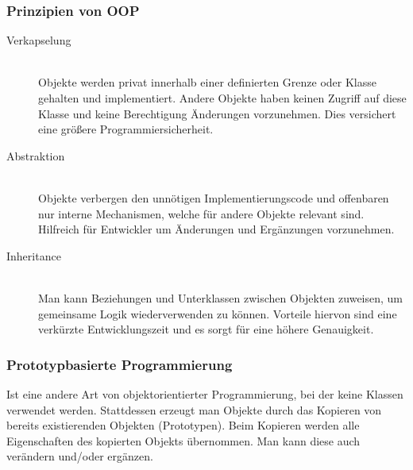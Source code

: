 \subsubsection{Prinzipien von OOP}
\begin{description}
\item[Verkapselung]\hfill \\
 Objekte werden privat innerhalb einer definierten Grenze oder Klasse gehalten und implementiert. 
 Andere Objekte haben keinen Zugriff auf diese Klasse und keine Berechtigung
 Änderungen vorzunehmen. Dies versichert eine größere Programmiersicherheit.
\item[Abstraktion]\hfill \\
Objekte verbergen den unnötigen Implementierungscode und offenbaren nur interne Mechanismen, welche 
für andere Objekte relevant sind. Hilfreich für Entwickler um Änderungen und Ergänzungen vorzunehmen.
\item[Inheritance]\hfill \\
Man kann Beziehungen und Unterklassen zwischen Objekten zuweisen, um gemeinsame Logik 
wiederverwenden zu können. Vorteile hiervon sind eine verkürzte Entwicklungszeit und 
es sorgt für eine höhere Genauigkeit.
\end{description}

\subsubsection{Prototypbasierte Programmierung}
Ist eine andere Art von objektorientierter Programmierung, bei der keine Klassen verwendet werden. 
Stattdessen erzeugt man Objekte durch das Kopieren von bereits existierenden Objekten (Prototypen). 
Beim Kopieren werden alle Eigenschaften des kopierten Objekts übernommen. 
Man kann diese auch verändern und/oder ergänzen.